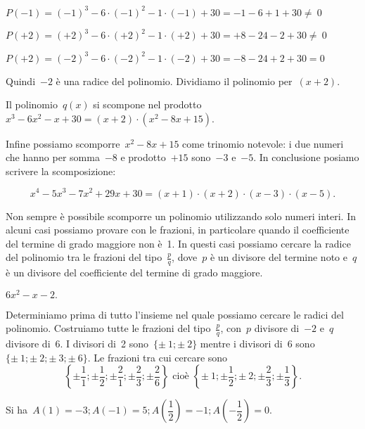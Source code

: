 \(P(-1)=(-1)^{3}-6\cdot (-1)^{2}-1\cdot (-1)+30=-1-6+1+30\neq~0\)

\(P(+2)=(+2)^{3}-6\cdot (+2)^{2}-1\cdot (+2)+30=+8-24-2+30\neq~0\)

\(P(+2)=(-2)^{3}-6\cdot (-2)^{2}-1\cdot (-2)+30=-8-24+2+30=0\)

\begin{multicols}{2}
 
Quindi~\(-2\) è una radice del polinomio. Dividiamo il polinomio per~\((x+2)\).
\begin{center}
% 
\scompruffinic
\end{center}

\end{multicols}

Il polinomio~\(q(x)\) si scompone nel
prodotto~\(x^{3}-6x^{2}-x+30=(x+2)\cdot (x^{2}-8x+15)\).

Infine possiamo scomporre~\(x^{2}-8x+15\) come trinomio notevole: i due
numeri che hanno per somma~\(-8\) e prodotto~\(+15\) sono~\(-3\) e~\(-5\). In
conclusione posiamo scrivere la scomposizione:

\[x^{4}-5x^{3}-7x^{2}+29x+30=(x+1)\cdot (x+2)\cdot (x-3)\cdot (x-5).\]

Non sempre è possibile scomporre un polinomio utilizzando solo numeri
interi. In alcuni casi possiamo provare con le frazioni, in particolare
quando il coefficiente del termine di grado maggiore non è~1. In
questi casi possiamo cercare la radice del polinomio tra le frazioni
del tipo~\(\frac{p}{q}\), dove~\(p\) è un divisore del termine noto e~\(q\) è
un divisore del coefficiente del termine di grado maggiore.


\begin{esempio}
\(6x^{2}-x-2.\)
\end{esempio}

Determiniamo prima di tutto l'insieme nel quale
possiamo cercare le radici del polinomio. Costruiamo tutte le frazioni
del tipo~\(\frac{p}{q}\), con~\(p\) divisore di~\(-2\) e~\(q\) divisore di~\(6\). I
divisori di~2 sono~\(\{\pm~1;\pm~2\}\) 
mentre i divisori di~6 sono~\(\{\pm~1;\pm~2;\pm~3;\pm~6\}\).
Le frazioni tra cui cercare sono
\[\left\{\pm {\frac{1}{1}};\pm \frac{1}{2};\pm \frac{2}{1};\pm
\frac{2}{3};\pm \frac{2}{6}\right\}
\text{ cioè }
\left\{\pm~1;\pm\frac{1}{2};\pm~2;\pm \frac{2}{3};\pm \frac{1}{3}\right\}.\]

Si ha~\(A(1)=-3; A(-1)=5; A\left(\dfrac{1}{2}\right)=
       -1; A\left(-{\dfrac{1}{2}}\right)=0\).

